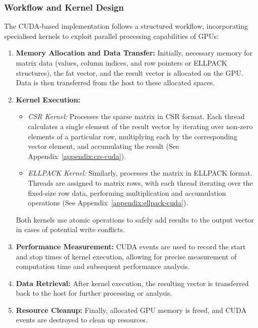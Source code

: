\documentclass[12pt,oneside]{book} %
\begin{document}
\subsubsection{Workflow and Kernel Design}

The CUDA-based implementation follows a structured workflow, incorporating
specialised kernels to exploit parallel processing capabilities of GPUs:

\begin{enumerate}
    \item \textbf{Memory Allocation and Data Transfer:} Initially, necessary memory for matrix data (values, column indices, and row pointers or ELLPACK structures), the fat vector, and the result vector is allocated on the GPU. Data is then transferred from the host to these allocated spaces.

    \item \textbf{Kernel Execution:}
          \begin{itemize}
              \item \textit{CSR Kernel:} Processes the sparse matrix in CSR format. Each thread calculates a single element of the result vector by iterating over non-zero elements of a particular row, multiplying each by the corresponding vector element, and accumulating the result (See Appendix~\ref{appendix:crs-cuda}).
              \item \textit{ELLPACK Kernel:} Similarly, processes the matrix in ELLPACK format. Threads are assigned to matrix rows, with each thread iterating over the fixed-size row data, performing multiplication and accumulation operations (See Appendix~\ref{appendix:ellpack-cuda}).
          \end{itemize}
          Both kernels use atomic operations to safely add results to the output vector in cases of potential write conflicts.

    \item \textbf{Performance Measurement:} CUDA events are used to record the start and stop times of kernel execution, allowing for precise measurement of computation time and subsequent performance analysis.

    \item \textbf{Data Retrieval:} After kernel execution, the resulting vector is transferred back to the host for further processing or analysis.

    \item \textbf{Resource Cleanup:} Finally, allocated GPU memory is freed, and CUDA events are destroyed to clean up resources.
\end{enumerate}
\end{document}
